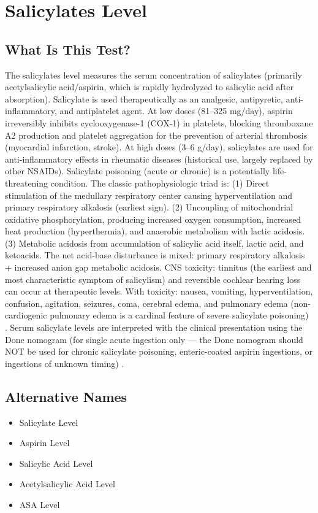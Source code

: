 \chapter{Salicylates Level}
\section*{What Is This Test?}
The salicylates level measures the serum concentration of salicylates (primarily acetylsalicylic acid/aspirin, which is rapidly hydrolyzed to salicylic acid after absorption). Salicylate is used therapeutically as an analgesic, antipyretic, anti-inflammatory, and antiplatelet agent. At low doses (81--325 mg/day), aspirin irreversibly inhibits cyclooxygenase-1 (COX-1) in platelets, blocking thromboxane A2 production and platelet aggregation for the prevention of arterial thrombosis (myocardial infarction, stroke). At high doses (3--6 g/day), salicylates are used for anti-inflammatory effects in rheumatic diseases (historical use, largely replaced by other NSAIDs). Salicylate poisoning (acute or chronic) is a potentially life-threatening condition. The classic pathophysiologic triad is: (1) Direct stimulation of the medullary respiratory center causing hyperventilation and primary respiratory alkalosis (earliest sign). (2) Uncoupling of mitochondrial oxidative phosphorylation, producing increased oxygen consumption, increased heat production (hyperthermia), and anaerobic metabolism with lactic acidosis. (3) Metabolic acidosis from accumulation of salicylic acid itself, lactic acid, and ketoacids. The net acid-base disturbance is mixed: primary respiratory alkalosis + increased anion gap metabolic acidosis. CNS toxicity: tinnitus (the earliest and most characteristic symptom of salicylism) and reversible cochlear hearing loss can occur at therapeutic levels. With toxicity: nausea, vomiting, hyperventilation, confusion, agitation, seizures, coma, cerebral edema, and pulmonary edema (non-cardiogenic pulmonary edema is a cardinal feature of severe salicylate poisoning) \cite{temple1981acute}. Serum salicylate levels are interpreted with the clinical presentation using the Done nomogram (for single acute ingestion only --- the Done nomogram should NOT be used for chronic salicylate poisoning, enteric-coated aspirin ingestions, or ingestions of unknown timing) \cite{done1960salicylate}.
\section*{Alternative Names}
\begin{itemize}
  \item Salicylate Level
  \item Aspirin Level
  \item Salicylic Acid Level
  \item Acetylsalicylic Acid Level
  \item ASA Level
\end{itemize}
